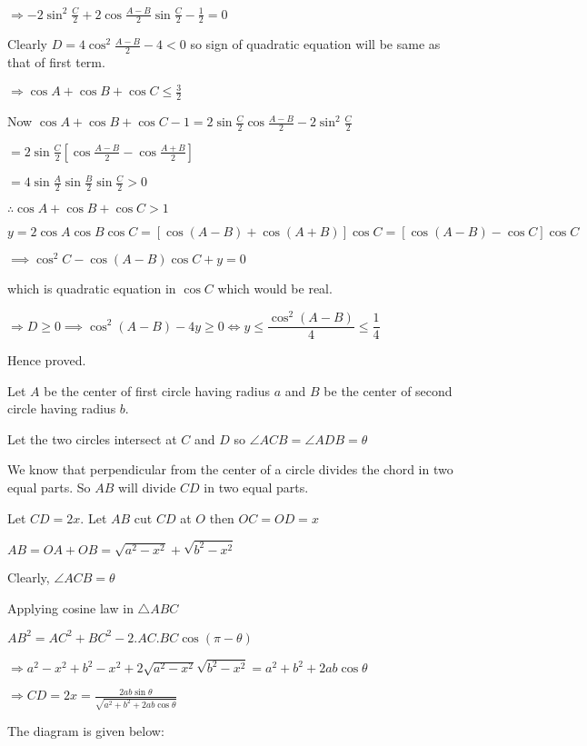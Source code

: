   $\Rightarrow  -2\sin^2\frac{C}{2} + 2\cos\frac{A - B}{2}\sin\frac{C}{2} - \frac{1}{2} = 0$

  Clearly $D = 4\cos^2\frac{A - B}{2} - 4 < 0$ so sign of quadratic equation will be same as that of first term.

  $\Rightarrow \cos A + \cos B + \cos C \leq \frac{3}{2}$

  Now $\cos A + \cos B + \cos C - 1 = 2\sin\frac{C}{2}\cos\frac{A - B}{2} - 2\sin^2\frac{C}{2}$

  $= 2\sin\frac{C}{2}\left[\cos\frac{A - B}{2} - \cos\frac{A + B}{2}\right]$

  $= 4\sin\frac{A}{2}\sin\frac{B}{2}\sin\frac{C}{2} > 0$

  $\therefore \cos A + \cos B + \cos C > 1$

\item $y=2\cos A\cos B\cos C=[\cos(A-B)+\cos(A+B)]\cos C=[\cos(A-B)-\cos C]\cos C$

  $\implies\cos^2C-\cos(A-B)\cos C+y=0$

  which is quadratic equation in $\cos C$ which would be real.

  $\Rightarrow D \geq 0 \implies \cos^2(A-B)-4y\ge0\iff y\le\dfrac{\cos^2(A-B)}4\le\dfrac14$

  Hence proved.

\item Let $A$ be the center of first circle having radius $a$ and $B$ be the center of second circle having radius $b.$

  Let the two circles intersect at $C$ and $D$ so $\angle ACB = \angle ADB = \theta$

  We know that perpendicular from the center of a circle divides the chord in two equal parts. So $AB$ will divide $CD$ in two equal parts.

  Let $CD = 2x.$ Let $AB$ cut $CD$ at $O$ then $OC = OD = x$

  $AB = OA + OB = \sqrt{a^2 - x^2} + \sqrt{b^2 - x^2}$

  Clearly, $\angle ACB = \theta$

  Applying cosine law in $\triangle ABC$

  $AB^2 = AC^2 + BC^2 - 2.AC.BC\cos(\pi - \theta)$

  $\Rightarrow a^2 - x^2 + b^2 - x^2 + 2\sqrt{a^2 - x^2}\sqrt{b^2 - x^2} = a^2 + b^2 + 2ab\cos\theta$

  $\Rightarrow CD = 2x = \frac{2ab\sin\theta}{\sqrt{a^2 + b^2 + 2ab\cos\theta}}$

\item The diagram is given below:

